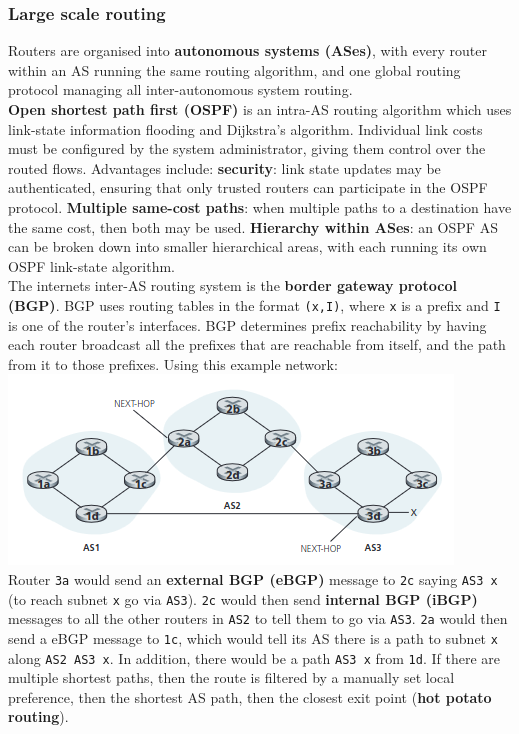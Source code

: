 \subsubsection{Large scale routing}
Routers are organised into \textbf{autonomous systems (ASes)}, with every router within an AS running the same routing algorithm, and one global routing protocol managing all inter-autonomous system routing.\\
\textbf{Open shortest path first (OSPF)} is an intra-AS routing algorithm which uses link-state information flooding and Dijkstra's algorithm. Individual link costs must be configured by the system administrator, giving them control over the routed flows. Advantages include: \textbf{security}: link state updates may be authenticated, ensuring that only trusted routers can participate in the OSPF protocol. \textbf{Multiple same-cost paths}: when multiple paths to a destination have the same cost, then both may be used. \textbf{Hierarchy within ASes}: an OSPF AS can be broken down into smaller hierarchical areas, with each running its own OSPF link-state algorithm.\\
The internets inter-AS routing system is the \textbf{border gateway protocol (BGP)}. BGP uses routing tables in the format \verb|(x,I)|, where \verb|x| is a prefix and \verb|I| is one of the router's interfaces. BGP determines prefix reachability by having each router broadcast all the prefixes that are reachable from itself, and the path from it to those prefixes. Using this example network:
\includegraphics[width=\linewidth]{../images/w9n2bgpExampleNetwork.png}\\
Router \verb|3a| would send an \textbf{external BGP (eBGP)} message to \verb|2c| saying \verb|AS3 x| (to reach subnet \verb|x| go via \verb|AS3|). \verb|2c| would then send \textbf{internal BGP (iBGP)} messages to all the other routers in \verb|AS2| to tell them to go via \verb|AS3|. \verb|2a| would then send a eBGP message to \verb|1c|, which would tell its AS there is a path to subnet \verb|x| along \verb|AS2 AS3 x|. In addition, there would be a path \verb|AS3 x| from \verb|1d|. If there are multiple shortest paths, then the route is filtered by a manually set local preference, then the shortest AS path, then the closest exit point (\textbf{hot potato routing}).\\
